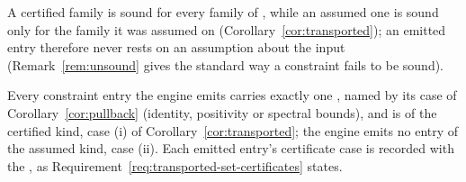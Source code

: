 
A certified family is sound for every family of ,
while an assumed one is sound only for the family it was assumed on
(Corollary~\ref{cor:transported}); an emitted entry therefore never rests on
an assumption about the input (Remark~\ref{rem:unsound} gives the standard
way a constraint fails to be sound).

\begin{requirement}\label{req:certified-entries-only}
Every constraint entry the engine emits carries exactly one
, named by its case of Corollary~\ref{cor:pullback}
(identity, positivity or spectral bounds), and is of the certified kind, case
(i) of Corollary~\ref{cor:transported}; the engine emits no entry of the
assumed kind, case (ii). Each emitted entry's certificate case is recorded
with the , as
Requirement~\ref{req:transported-set-certificates} states.
\end{requirement}
